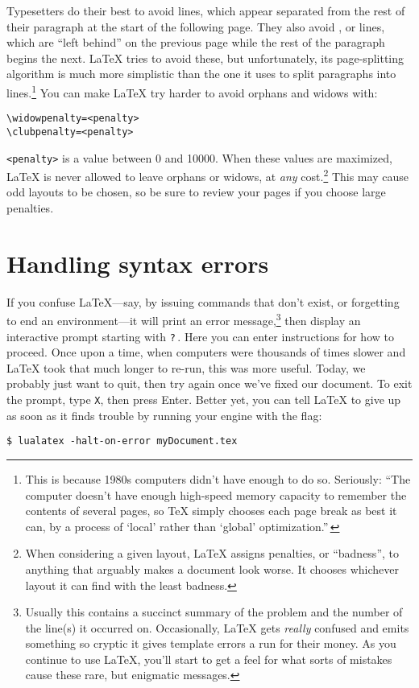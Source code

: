 Typesetters do their best to avoid  lines,
which appear separated from the rest of their paragraph at the start of the
following page.
They also avoid , or  lines,
which are ``left behind'' on the previous page while the rest of the paragraph
begins the next.
\LaTeX{} tries to avoid these, but unfortunately, its page-splitting algorithm
is much more simplistic than the one it uses
to split paragraphs into lines.\punckern\footnote{This is because
1980s computers didn't have enough  to do so. Seriously:
``The computer doesn't have enough high-speed memory capacity to remember the
contents of several pages,
so \TeX{} simply chooses each page break as best it can, by a process of
`local' rather than `global' optimization.\quotekern''\,}
You can make \LaTeX{} try harder to avoid orphans and widows with:
\begin{leftfigure}
\begin{lstlisting}
\widowpenalty=<penalty>
\clubpenalty=<penalty>
\end{lstlisting}
\end{leftfigure}
\verb|<penalty>| is a value between 0 and 10000.
When these values are maximized,
\LaTeX{} is never allowed to leave orphans or widows,
at \emph{any} cost.\punckern\footnote{When considering a given layout,
\LaTeX{} assigns penalties, or ``badness''\quotekern,
to anything that arguably makes a document look worse.
It chooses whichever layout it can find with the least badness.}
This may cause odd layouts to be chosen,
so be sure to review your pages if you choose large penalties.

\section{Handling syntax errors}
If you confuse \LaTeX{}---say, by issuing commands that don't exist,
or forgetting to end an environment---it will print an
error message,\punckern\footnote{Usually this contains a succinct summary of
the problem and the number of the line(s) it occurred on. Occasionally,
\LaTeX{} gets \emph{really} confused and emits something so cryptic it gives
\cpp{} template errors a run for their money.
As you continue to use \LaTeX, you'll start to get a feel for what sorts of
mistakes cause these rare, but enigmatic messages.}
then display an interactive prompt starting with \texttt{?}\,.
Here you can enter instructions for how to proceed.
Once upon a time, when computers were thousands of times slower and
\LaTeX{} took that much longer to re-run, this was more useful.
Today, we probably just want to quit,
then try again once we've fixed our document.
To exit the prompt, type \texttt{X}, then press Enter.
Better yet, you can tell \LaTeX{} to give up as soon as it finds trouble
by running your engine with the  flag:
\begin{leftfigure}
\begin{lstlisting}
$ lualatex -halt-on-error myDocument.tex
\end{lstlisting}
\end{leftfigure}
